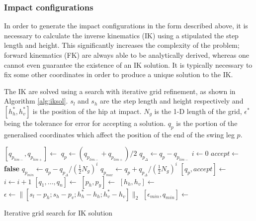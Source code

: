 \subsubsection{Impact configurations}
In order to generate the impact configurations in the form described above, it is necessary to calculate the inverse kinematics (IK) using a stipulated the step length and height. This significantly increases the complexity of the problem; forward kinematics (FK) are always able to be analytically derived, whereas one cannot even guarantee the existence of an IK solution. It is typically necessary to fix some other coordinates in order to produce a unique solution to the IK. %

The IK are solved using a search with iterative grid refinement, as shown in Algorithm \ref{alg:iksol}. $s_l$ and $s_h$ are the step length and height respectively and $[h_h^*, h_v^*]$ is the position of the hip at impact. $N_g$ is the 1-D length of the grid, $\epsilon^*$ being the tolerance for error for accepting a solution. $q_p$ is the portion of the generalised coordinates which affect the position of the end of the swing leg $p$. 
\begin{algorithm}
\begin{algorithmic}[1]
		\State $[q_{p_{lim-}},q_{p_{lim+}}] \gets$ 
		\State $q_p \gets (q_{p_{lim-}}+q_{p_{lim+}})/2$
		\State $q_{p_\Delta} \gets q_p - q_{p_{lim-}}$
		\State $i \gets 0$
		\State $accept \gets$ \textbf{false}
			\State $q_{p_{min}} \gets q_p - q_{p_\Delta} / (\tfrac{1}{2}N_g)^i$
			\State $q_{p_{max}} \gets q_p + q_{p_\Delta} / (\tfrac{1}{2}N_g)^i$
			\State $[q_p,accept] \gets$ 
			\State $i \gets i + 1$
		\EndWhile
		\State {}
	\EndFunction
		\State $[q_1, \ldots, q_n] \gets$ 
		\State $[p_h, p_y] \gets$ 
		\State $[h_h, h_v] \gets$ 
		\State $\epsilon \gets \lVert [s_l-p_h; s_h-p_v; h_h^*-h_h; h_v^*-h_v] \rVert_2$
		\State $[\epsilon_{min}, q_{min}] \gets$ 
		\State {}
	\EndFunction
\end{algorithmic}
\caption{Iterative grid search for IK solution}
\label{alg:iksol}
\end{algorithm}

